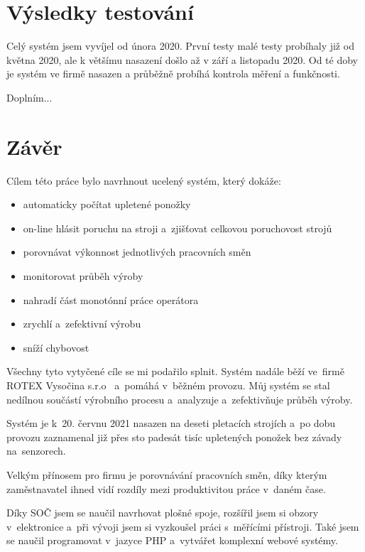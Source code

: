 \documentclass{template/socthesis}
\begin{document}
\section{Výsledky testování}
Celý systém jsem vyvíjel od února 2020. První testy malé testy probíhaly již od května 2020, ale k většímu nasazení došlo až v září a listopadu 2020.
Od té doby je systém ve firmě nasazen a průběžně probíhá kontrola měření a funkčnosti.

Doplním...






\section{Závěr}

Cílem této práce bylo navrhnout ucelený systém, který dokáže:

\begin{itemize}
    \item automaticky počítat upletené ponožky
    \item on-line hlásit poruchu na stroji a~zjišťovat celkovou poruchovost strojů
    \item porovnávat výkonnost jednotlivých pracovních směn
    \item monitorovat průběh výroby
    \item nahradí část monotónní práce operátora
    \item zrychlí a~zefektivní výrobu
    \item sníží chybovost
\end{itemize}

Všechny tyto vytyčené cíle se mi podařilo splnit. Systém nadále běží ve~firmě ROTEX Vysočina s.r.o~\cite{ROTEX} a~pomáhá v~běžném provozu.
Můj systém se stal nedílnou součástí výrobního procesu a analyzuje a~zefektivňuje průběh výroby.

Systém je k 20. červnu 2021 nasazen na deseti pletacích strojích a po dobu provozu zaznamenal již přes sto padesát tisíc upletených ponožek bez závady na~senzorech.

Velkým přínosem pro firmu je porovnávání pracovních směn, díky kterým zaměstnavatel ihned vidí rozdíly mezi produktivitou práce v~daném čase.

Díky SOČ jsem se naučil navrhovat plošné spoje, rozšířil jsem si obzory v~elektronice a~při vývoji jsem si vyzkoušel práci s~měřícími přístroji. 
Také jsem se naučil programovat v~jazyce PHP a~vytvářet komplexní webové systémy.
\end{document}
